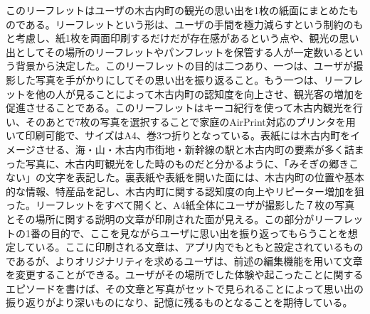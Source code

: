 このリーフレットはユーザの木古内町の観光の思い出を1枚の紙面にまとめたものである。リーフレットという形は、ユーザの手間を極力減らすという制約のもと考慮し、紙1枚を両面印刷するだけだが存在感があるという点や、観光の思い出としてその場所のリーフレットやパンフレットを保管する人が一定数いるという背景から決定した。このリーフレットの目的は二つあり、一つは、ユーザが撮影した写真を手がかりにしてその思い出を振り返ること。もう一つは、リーフレットを他の人が見ることによって木古内町の認知度を向上させ、観光客の増加を促進させることである。このリーフレットはキーコ紀行を使って木古内観光を行い、そのあとで7枚の写真を選択することで家庭のAirPrint対応のプリンタを用いて印刷可能で、サイズはA4、巻3つ折りとなっている。表紙には木古内町をイメージさせる、海・山・木古内市街地・新幹線の駅と木古内町の要素が多く詰まった写真に、木古内町観光をした時のものだと分かるように、「みそぎの郷きこない」の文字を表記した。裏表紙や表紙を開いた面には、木古内町の位置や基本的な情報、特産品を記し、木古内町に関する認知度の向上やリピーター増加を狙った。リーフレットをすべて開くと、A4紙全体にユーザが撮影した７枚の写真とその場所に関する説明の文章が印刷された面が見える。この部分がリーフレットの1番の目的で、ここを見ながらユーザに思い出を振り返ってもらうことを想定している。ここに印刷される文章は、アプリ内でもともと設定されているものであるが、よりオリジナリティを求めるユーザは、前述の編集機能を用いて文章を変更することができる。ユーザがその場所でした体験や起こったことに関するエピソードを書けば、その文章と写真がセットで見られることによって思い出の振り返りがより深いものになり、記憶に残るものとなることを期待している。

